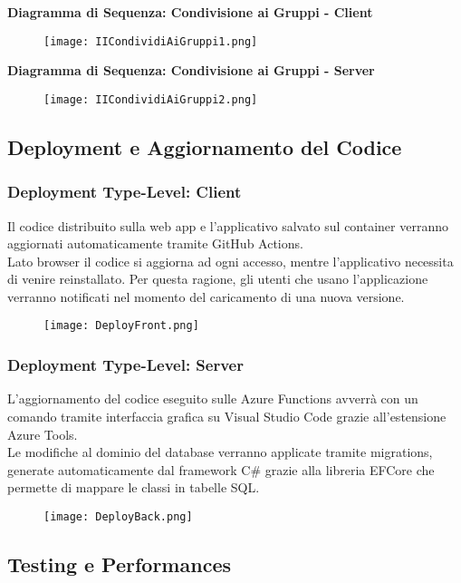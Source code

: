 \textbf{Diagramma di Sequenza: Condivisione ai Gruppi - Client}\\
\begin{figure}[h!]
    \begin{center}
        \texttt{[image: IICondividiAiGruppi1.png]}
    \end{center}
\end{figure}

\textbf{Diagramma di Sequenza: Condivisione ai Gruppi - Server}\\
\begin{figure}[h!]
    \begin{center}
        \texttt{[image: IICondividiAiGruppi2.png]}
    \end{center}
\end{figure}
\clearpage


\clearpage
\subsection{Deployment e Aggiornamento del Codice}

\subsubsection{Deployment Type-Level: Client}
Il codice distribuito sulla web app e l'applicativo salvato sul container verranno aggiornati automaticamente tramite GitHub Actions.\\
Lato browser il codice si aggiorna ad ogni accesso, mentre l'applicativo necessita di venire reinstallato. 
Per questa ragione, gli utenti che usano l'applicazione verranno notificati nel momento del caricamento di una nuova versione.\\

\begin{figure}[h!]
    \begin{center}
        \texttt{[image: DeployFront.png]}
    \end{center}
\end{figure}

\subsubsection{Deployment Type-Level: Server}
L'aggiornamento del codice eseguito sulle Azure Functions avverrà con un comando tramite interfaccia grafica su Visual Studio Code grazie all'estensione Azure Tools.\\
Le modifiche al dominio del database verranno applicate tramite migrations, generate automaticamente dal framework C\# grazie alla libreria EFCore che permette di mappare le classi in tabelle SQL.\\
\begin{figure}[h!]
    \begin{center}
        \texttt{[image: DeployBack.png]}
    \end{center}
\end{figure}


\subsection{Testing e Performances}
